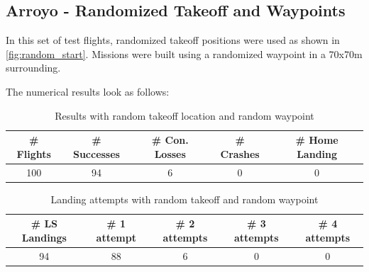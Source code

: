 
\subsection{Arroyo - Randomized Takeoff and Waypoints}\label{subsec:compl_rand}

    In this set of test flights, randomized takeoff positions were used as shown in \cref{fig:random_start}. Missions were built using a randomized waypoint in a 70x70m surrounding.

    The numerical results look as follows:

    \begin{table}[h]
        \begin{center}
         \caption{Results with random takeoff location and random waypoint}\vspace{1ex}
         \label{tab:result_complete_rand}
         \begin{tabular}{|c|c|c|c|c|}
         \hline
         \# Flights & \# Successes & \# Con. Losses & \# Crashes & \# Home Landing\\ \hline \hline
         100 & 94 & 6 & 0 & 0 \\
         \hline
         \end{tabular}
        \end{center}
    \end{table}
    \begin{table}[h]
        \begin{center}
         \caption{Landing attempts with random takeoff and random waypoint}\vspace{1ex}
         \label{tab:land_nums_complete_rand}
         \begin{tabular}{|c|c|c|c|c|}
         \hline
         \# LS Landings & \# 1 attempt & \# 2 attempts & \# 3 attempts & \# 4 attempts\\ \hline \hline
         94 & 88 & 6 & 0 & 0 \\
         \hline
         \end{tabular}
        \end{center}
    \end{table}

